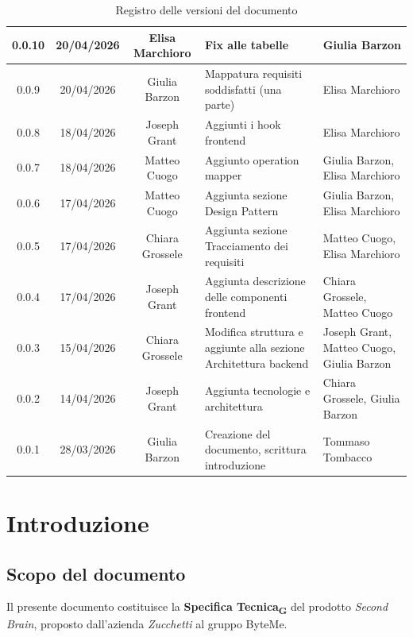 \documentclass[11pt,a4paper]{article}
\newcommand{\gls}[1]{#1\textsubscript{G}}
\begin{document}
\begin{table}[H]
\begin{tabular}{|c|c|c|>{\raggedright\arraybackslash}p{}|p{}|}
        \hline
        0.0.10 & 20/04/2026 & Elisa Marchioro & Fix alle tabelle & Giulia Barzon\\
        \hline
        0.0.9 & 20/04/2026 & Giulia Barzon & Mappatura requisiti soddisfatti (una parte) & Elisa Marchioro\\
        \hline
        0.0.8 & 18/04/2026 & Joseph Grant & Aggiunti i hook frontend & Elisa Marchioro\\
        \hline
        0.0.7 & 18/04/2026 & Matteo Cuogo & Aggiunto operation mapper & Giulia Barzon, Elisa Marchioro\\
        \hline
        0.0.6 & 17/04/2026 & Matteo Cuogo & Aggiunta sezione Design Pattern & Giulia Barzon, Elisa Marchioro\\
        \hline
        0.0.5 & 17/04/2026 & Chiara Grossele & Aggiunta sezione Tracciamento dei requisiti & Matteo Cuogo, Elisa Marchioro\\
        \hline
        0.0.4 & 17/04/2026 & Joseph Grant & Aggiunta descrizione delle componenti frontend & Chiara Grossele, Matteo Cuogo\\
        \hline
        0.0.3 & 15/04/2026 & Chiara Grossele & Modifica struttura e aggiunte alla sezione Architettura backend & Joseph Grant, Matteo Cuogo, Giulia Barzon \\
        \hline
        0.0.2 & 14/04/2026 & Joseph Grant & Aggiunta tecnologie e architettura & Chiara Grossele, Giulia Barzon\\
        \hline
        0.0.1 & 28/03/2026 & Giulia Barzon & Creazione del documento, scrittura introduzione & Tommaso Tombacco \\
        \hline
    \end{tabular}
    \caption{Registro delle versioni del documento}
    \label{tab:versionamento}
\end{table}
\newpage

\tableofcontents
\thispagestyle{empty}
\newpage

{} 
\listoffigures 
\newpage

\setcounter{page}{1}

\section{Introduzione}
\subsection{Scopo del documento}
Il presente documento costituisce la \textbf{\gls{Specifica Tecnica}} del prodotto \textit{Second Brain}, proposto dall'azienda \textit{Zucchetti} al gruppo ByteMe.
 
\end{document}
